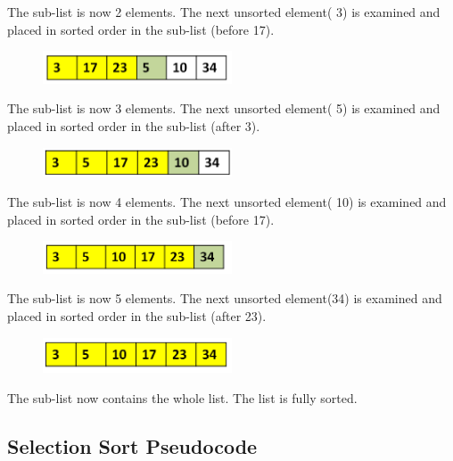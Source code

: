 The sub-list is now 2 elements.  The next unsorted element( 3) is examined and placed in sorted order in the sub-list  (before 17).

\begin{figure}[H]
\centering
\includegraphics[width=0.5\textwidth]{pictures/insert3.png}
\label{fig:insert3}
\end{figure}

The sub-list is now 3 elements.  The next unsorted element( 5) is examined and placed in sorted order in the sub-list  (after 3).


\begin{figure}[H]
\centering
\includegraphics[width=0.5\textwidth]{pictures/insert4.png}
\label{fig:insert4}
\end{figure}

The sub-list is now 4 elements.  The next unsorted element( 10) is examined and placed in sorted order in the sub-list  (before 17).


\begin{figure}[H]
\centering
\includegraphics[width=0.5\textwidth]{pictures/insert5.png}
\label{fig:insert5}
\end{figure}

The sub-list is now 5 elements.  The next unsorted element(34) is examined and placed in sorted order in the sub-list  (after 23).


\begin{figure}[H]
\centering
\includegraphics[width=0.5\textwidth]{pictures/insert6.png}
\label{fig:insert6}
\end{figure}

The sub-list now contains the whole list. The list is fully sorted.

\subsection{Selection Sort Pseudocode}

